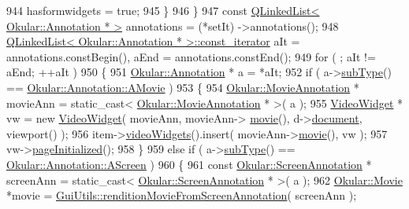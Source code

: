 \begin{DoxyCode}
944                 hasformwidgets = \textcolor{keyword}{true};
945             \}
946         \}
947         \textcolor{keyword}{const} \hyperlink{classQLinkedList}{QLinkedList< Okular::Annotation * >} annotations = (*setIt)
      ->annotations();
948         \hyperlink{classQLinkedList}{QLinkedList< Okular::Annotation * >::const\_iterator}
       aIt = annotations.constBegin(), aEnd = annotations.constEnd();
949         \textcolor{keywordflow}{for} ( ; aIt != aEnd; ++aIt )
950         \{
951             \hyperlink{classOkular_1_1Annotation}{Okular::Annotation} * a = *aIt;
952             \textcolor{keywordflow}{if} ( a->\hyperlink{classOkular_1_1Annotation_af9833449767eacd740f377e69a1fdd48}{subType}() == \hyperlink{classOkular_1_1Annotation_af71b46e37d5f850b97d5c4de3be9aac0a711a9d706a86b55f0799e944fb2750e6}{Okular::Annotation::AMovie} )
953             \{
954                 \hyperlink{classOkular_1_1MovieAnnotation}{Okular::MovieAnnotation} * movieAnn = \textcolor{keyword}{static\_cast<} 
      \hyperlink{classOkular_1_1MovieAnnotation}{Okular::MovieAnnotation} * \textcolor{keyword}{>}( a );
955                 \hyperlink{classVideoWidget}{VideoWidget} * vw = \textcolor{keyword}{new} \hyperlink{classVideoWidget}{VideoWidget}( movieAnn, movieAnn->
      \hyperlink{classOkular_1_1MovieAnnotation_a1fc38e32a1704351c3e5916031be0267}{movie}(), d->\hyperlink{classPageViewPrivate_a50645b9853306cffd74e51efb677e5b4}{document}, viewport() );
956                 item->\hyperlink{classPageViewItem_a125302408597cab2a58ef2ad309e2912}{videoWidgets}().insert( movieAnn->\hyperlink{classOkular_1_1MovieAnnotation_a1fc38e32a1704351c3e5916031be0267}{movie}(), vw );
957                 vw->\hyperlink{classVideoWidget_a90dbdcbaffc7717c7e3b327ad076bc58}{pageInitialized}();
958             \}
959             \textcolor{keywordflow}{else} \textcolor{keywordflow}{if} ( a->\hyperlink{classOkular_1_1Annotation_af9833449767eacd740f377e69a1fdd48}{subType}() == \hyperlink{classOkular_1_1Annotation_af71b46e37d5f850b97d5c4de3be9aac0a7cf8ba374ec139a8e2fb47a36182fa32}{Okular::Annotation::AScreen} )
960             \{
961                 \textcolor{keyword}{const} \hyperlink{classOkular_1_1ScreenAnnotation}{Okular::ScreenAnnotation} * screenAnn = \textcolor{keyword}{static\_cast<} 
      \hyperlink{classOkular_1_1ScreenAnnotation}{Okular::ScreenAnnotation} * \textcolor{keyword}{>}( a );
962                 \hyperlink{classOkular_1_1Movie}{Okular::Movie} *movie = 
      \hyperlink{namespaceGuiUtils_a51c606d14a293d5b3f5f49ad1c12be44}{GuiUtils::renditionMovieFromScreenAnnotation}( screenAnn );

\end{DoxyCode}
